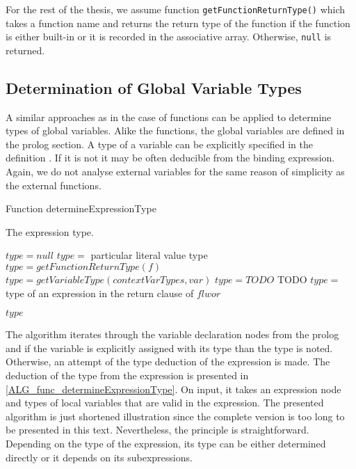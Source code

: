 For the rest of the thesis, we assume function \texttt{getFunctionReturnType()} which takes a function name and returns the return type of the function if the function is either built-in or it is recorded in the associative array. Otherwise, \texttt{null} is returned.

\subsection{Determination of Global Variable Types}
A similar approaches as in the case of functions can be applied to determine types of global variables. Alike the functions, the global variables are defined in the prolog section. A type of a variable can be explicitly specified in the definition . If it is not it may be often deducible from the binding expression. Again, we do not analyse external variables for the same reason of simplicity as the external functions.

\begin{algorithm}
\caption{Function determineExpressionType}
\label{ALG_func_determineExpressionType}
\begin{algorithmic}[1]
\ENSURE The expression type.

\STATE $type = null$
     \STATE $type =$ particular literal value type
     \STATE $type = getFunctionReturnType(f)$
     \STATE $type = getVariableType(contextVarTypes, var)$
     \STATE $type = TODO$
     \STATE TODO
     \STATE  $type =$ type of an expression in the return clause of $flwor$
\ENDIF

\RETURN $type$
\end{algorithmic}
\end{algorithm}

The algorithm iterates through the variable declaration nodes from the prolog and if the variable is explicitly assigned with its type than the type is noted. Otherwise, an attempt of the type deduction of the expression is made. The deduction of the type from the expression is presented in \ref{ALG_func_determineExpressionType}. On input, it takes an expression node and types of local variables that are valid in the expression. The presented algorithm is just shortened illustration since the complete version is too long to be presented in this text. Nevertheless, the principle is straightforward. Depending on the type of the expression, its type can be either determined directly or it depends on its subexpressions.

